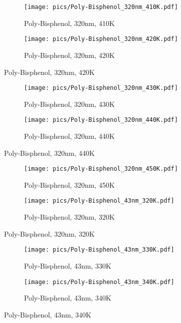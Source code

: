 \begin{figure}[!htb]
\centering
\begin{subfigure}[t]{.5\textwidth}
  \centering
  \texttt{[image: pics/Poly-Bisphenol\_320nm\_410K.pdf]}
  \caption{Poly-Bisphenol, 320nm, 410K}
  \label{fig:sub17}
\end{subfigure}%
\begin{subfigure}[t]{.5\textwidth}
  \centering
  \texttt{[image: pics/Poly-Bisphenol\_320nm\_420K.pdf]}
  \caption{Poly-Bisphenol, 320nm, 420K}
  \label{fig:sub18}
\end{subfigure}%
\end{figure}

\begin{figure}[!htb]
\centering
\begin{subfigure}[t]{.5\textwidth}
  \centering
  \texttt{[image: pics/Poly-Bisphenol\_320nm\_430K.pdf]}
  \caption{Poly-Bisphenol, 320nm, 430K}
  \label{fig:sub19}
\end{subfigure}%
\begin{subfigure}[t]{.5\textwidth}
  \centering
  \texttt{[image: pics/Poly-Bisphenol\_320nm\_440K.pdf]}
  \caption{Poly-Bisphenol, 320nm, 440K}
  \label{fig:sub20}
\end{subfigure}%
\end{figure}

\begin{figure}[!htb]
\centering
\begin{subfigure}[t]{.5\textwidth}
  \centering
  \texttt{[image: pics/Poly-Bisphenol\_320nm\_450K.pdf]}
  \caption{Poly-Bisphenol, 320nm, 450K}
  \label{fig:sub21}
\end{subfigure}%
\begin{subfigure}[t]{.5\textwidth}
  \centering
  \texttt{[image: pics/Poly-Bisphenol\_43nm\_320K.pdf]}
  \caption{Poly-Bisphenol, 320nm, 320K}
  \label{fig:sub22}
\end{subfigure}%
\end{figure}

\begin{figure}[!htb]
\centering
\begin{subfigure}[t]{.5\textwidth}
  \centering
  \texttt{[image: pics/Poly-Bisphenol\_43nm\_330K.pdf]}
  \caption{Poly-Bisphenol, 43nm, 330K}
  \label{fig:sub23}
\end{subfigure}%
\begin{subfigure}[t]{.5\textwidth}
  \centering
  \texttt{[image: pics/Poly-Bisphenol\_43nm\_340K.pdf]}
  \caption{Poly-Bisphenol, 43nm, 340K}
  \label{fig:sub24}
\end{subfigure}%
\end{figure}

